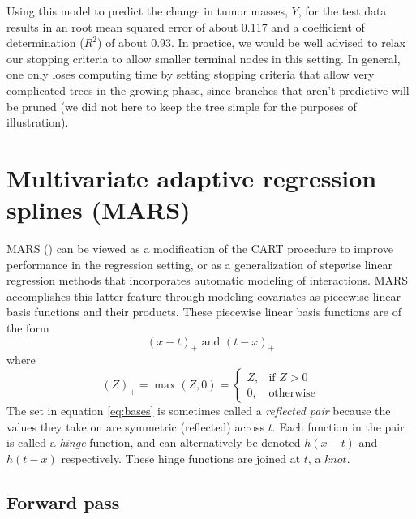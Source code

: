 \documentclass[12pt]{article}
\begin{document}
Using this model to predict the change in tumor masses, $Y$, for the test data results in an root mean squared error of about 0.117 and a coefficient of determination ($R^2$) of about 0.93. In practice, we would be well advised to relax our stopping criteria to allow smaller terminal nodes in this setting. In general, one only loses computing time by setting stopping criteria that allow very complicated trees in the growing phase, since branches that aren't predictive will be pruned (we did not here to keep the tree simple for the purposes of illustration).




\section{Multivariate adaptive regression splines (MARS)} %
\label{sec:mars}

MARS (\cite{mars}) can be viewed as a modification of the CART procedure to improve performance in the regression setting, or as a generalization of stepwise linear regression methods that incorporates automatic modeling of interactions. MARS accomplishes this latter feature through modeling covariates as piecewise linear basis functions and their products. These piecewise linear basis functions are of the form
%
\begin{equation} \label{eq:bases}
  (x - t)_{+} \text{ and } (t - x)_{+}
\end{equation} where
%
\begin{equation}
  (Z)_{+} = \max(Z, 0) = \begin{cases}
  Z, & \text{if } Z > 0 \\
  0, & \text{otherwise}
  \end{cases}
\end{equation}
The set in equation \ref{eq:bases} is sometimes called a \emph{reflected pair} because the values they take on are symmetric (reflected) across $t$. Each function in the pair is called a \emph{hinge} function, and can alternatively be denoted $h(x - t)$ and $h(t - x)$ respectively. These hinge functions are joined at $t$, a $knot$.

\subsection{Forward pass} %
\label{sub:forward_pass}
\end{document}
